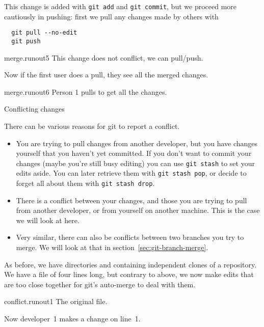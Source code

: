 This change is added with \lstinline{git add} and \lstinline{git commit},
but we proceed more cautiously in pushing: first we pull any changes made by others with
\begin{lstlisting}
  git pull --no-edit
  git push
\end{lstlisting}

\begin{gitstep}{merge.runout5}
  This change does not conflict, we can pull/push.
\end{gitstep}

Now if the first user does a pull, they see all the merged changes.

\begin{gitstep}{merge.runout6}
  Person 1 pulls to get all the changes.
\end{gitstep}

\newpage
{} {Conflicting changes}
\label{sec:git-conflict}

There can be various reasons for git to report a conflict.
\begin{itemize}
\item You are trying to pull changes from another developer, but you have changes
  yourself that you haven't yet committed.
  If you don't want to commit your changes
  (maybe you're still busy editing)
  you can use \lstinline{git stash} to set your edits aside.
  You can later retrieve them with \lstinline{git stash pop},
  or decide to forget all about them with \lstinline{git stash drop}.
\item There is a conflict between your changes, and those you are trying to pull
  from another developer, or from yourself on another machine.
  This is the case we will look at here.
\item Very similar, there can also be conflicts between two branches you try to merge.
  We will look at that in section~\ref{sec:git-branch-merge}.
\end{itemize}

As before, we have directories  and 
containing independent clones of a repository.
We have a file of four lines long, but contrary to above,
we now make edits that are too close together for git's
auto-merge to deal with them.

\begin{gitstep}{conflict.runout1}
  The original file.
\end{gitstep}

Now developer~1 makes a change on line~1.

